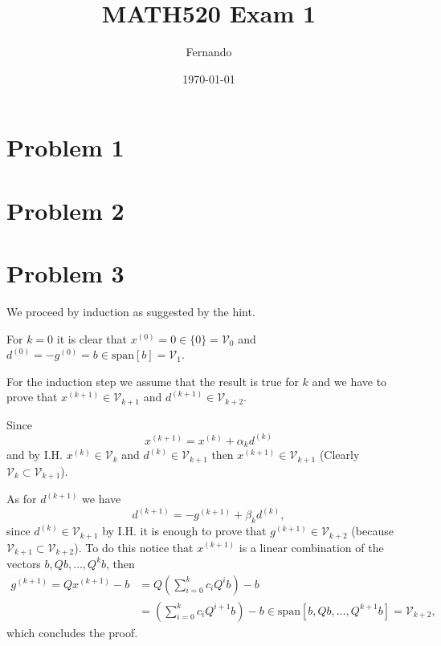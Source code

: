 \documentclass{article}
\begin{document}
\title{MATH520 Exam 1}
\author{Fernando}
\date{\today}
\maketitle

\section*{Problem 1}
\section*{Problem 2}
\section*{Problem 3}
We proceed by induction as suggested by the hint.

For $k=0$ it is clear that $x^{(0)}=0\in\{0\}=\mathcal{V}_0$ and
$d^{(0)}=-g^{(0)}=b\in \text{span}[b]=\mathcal{V}_1$.

For the induction step we assume that the result is true for $k$ and we have to
prove that $x^{(k+1)}\in \mathcal{V}_{k+1}$ and $d^{(k+1)}\in
\mathcal{V}_{k+2}$.

Since
\[
x^{(k+1)}=x^{(k)}+\alpha_kd^{(k)}
\]
and by I.H. $x^{(k)}\in \mathcal{V}_k$ and $d^{(k)}\in\mathcal{V}_{k+1}$ then
$x^{(k+1)}\in
\mathcal{V}_{k+1}$ (Clearly $\mathcal{V}_k\subset\mathcal{V}_{k+1}$).

As for $d^{(k+1)}$ we have
\[
d^{(k+1)}=-g^{(k+1)}+\beta_k d^{(k)},
\]
since $d^{(k)}\in\mathcal{V}_{k+1}$ by I.H. it is enough to prove that
$g^{(k+1)}\in\mathcal{V}_{k+2}$ (because
$\mathcal{V}_{k+1}\subset\mathcal{V}_{k+2}$). To do this notice that
$x^{(k+1)}$ is a linear combination of the vectors $b,Qb,\dots,Q^{k}b$, then
\begin{align*}
g^{(k+1)}=Qx^{(k+1)}-b&=Q\left(\sum_{i=0}^kc_iQ^ib\right) -b\\
&=\left(\sum_{i=0}^kc_iQ^{i+1}b\right)-b \in
\text{span}[b,Qb,\dots,Q^{k+1}b]=\mathcal{V}_{k+2},
\end{align*}
which concludes the proof.
\end{document}
